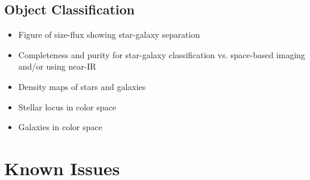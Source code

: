\subsection{Object Classification}

\begin{itemize}

\item Figure of size-flux showing star-galaxy separation

\item Completeness and purity for star-galaxy classification vs. space-based imaging and/or using near-IR

\item Density maps of stars and galaxies

\item Stellar locus in color space

\item Galaxies in color space

\end{itemize}

\section {Known Issues}








